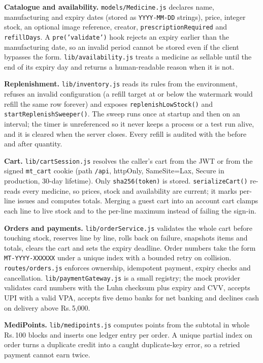 \documentclass[11pt,a4paper]{article}
\providecommand{\rupee}{Rs.\,}
\begin{document}
\noindent\textbf{Catalogue and availability.} \texttt{models/Medicine.js} declares name,
manufacturing and expiry dates (stored as \texttt{YYYY-MM-DD} strings), price, integer
stock, an optional image reference, creator, \texttt{prescriptionRequired} and
\texttt{refillDays}. A \texttt{pre('validate')} hook rejects an expiry earlier than the
manufacturing date, so an invalid period cannot be stored even if the client bypasses
the form. \texttt{lib/availability.js} treats a medicine as sellable until the end of
its expiry day and returns a human-readable reason when it is not.

\noindent\textbf{Replenishment.} \texttt{lib/inventory.js} reads its rules from the
environment, refuses an invalid configuration (a refill target at or below the watermark
would refill the same row forever) and exposes \texttt{replenishLowStock()} and
\texttt{startReplenishSweeper()}. The sweep runs once at startup and then on an interval;
the timer is unreferenced so it never keeps a process or a test run alive, and it is
cleared when the server closes. Every refill is audited with the before and after
quantity.

\noindent\textbf{Cart.} \texttt{lib/cartSession.js} resolves the caller's cart from the
JWT or from the signed \texttt{mt\_cart} cookie (path \texttt{/api}, httpOnly,
SameSite=Lax, Secure in production, 30-day lifetime). Only \texttt{sha256(token)} is
stored. \texttt{serializeCart()} re-reads every medicine, so prices, stock and
availability are current; it marks per-line issues and computes totals. Merging a guest
cart into an account cart clamps each line to live stock and to the per-line maximum
instead of failing the sign-in.


\noindent\textbf{Orders and payments.} \texttt{lib/orderService.js} validates the whole
cart before touching stock, reserves line by line, rolls back on failure, snapshots items
and totals, clears the cart and sets the expiry deadline. Order numbers take the form
\texttt{MT-YYYY-XXXXXX} under a unique index with a bounded retry on collision.
\texttt{routes/orders.js} enforces ownership, idempotent payment, expiry checks and
cancellation. \texttt{lib/paymentGateway.js} is a small registry; the mock provider
validates card numbers with the Luhn checksum plus expiry and CVV, accepts UPI with a
valid VPA, accepts five demo banks for net banking and declines cash on delivery above
\rupee5,000.

\noindent\textbf{MediPoints.} \texttt{lib/medipoints.js} computes points from the
subtotal in whole \rupee100 blocks and inserts one ledger entry per order. A unique
partial index on order turns a duplicate credit into a caught duplicate-key error, so a
retried payment cannot earn twice.
\end{document}
